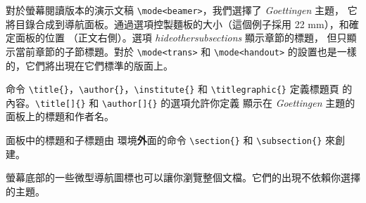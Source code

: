對於螢幕閱讀版本的演示文稿 \verb|\mode<beamer>|，我們選擇了 \emph{Goettingen} 主題，
它將目錄合成到導航面板。通過選項控製麵板的大小（這個例子採用 22 mm），和確定面板的位置
（正文右側）。選項 \emph{hideothersubsections} 顯示章節的標題，
但只顯示當前章節的子節標題。對於
 \verb|\mode<trans>| 和 \verb|\mode<handout>| 的設置也是一樣的，它們將出現在它們標準的版面上。


命令 \verb|\title{}|，\verb|\author{}|，\verb|\institute{}| 和 \verb|\titlegraphic{}| 定義標題頁
的內容。\verb|\title[]{}| 和 \verb|\author[]{}| 的選項允許你定義
顯示在 \emph{Goettingen} 主題的面板上的標題和作者名。


面板中的標題和子標題由  環境{\textbf
外面}的命令 \verb|\section{}| 和 \verb|\subsection{}| 來創建。


螢幕底部的一些微型導航圖標也可以讓你瀏覽整個文檔。它們的出現不依賴你選擇的主題。


